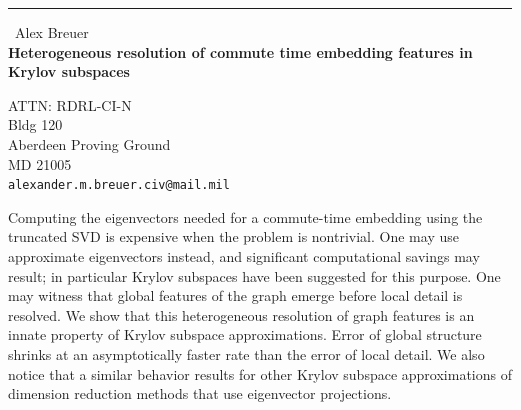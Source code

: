 \documentclass{report}
\begin{document}
\begin{center}
\rule{6in}{1pt} \
{\large Alex Breuer \\
{\bf Heterogeneous resolution of commute time embedding features in Krylov subspaces}}

ATTN: RDRL-CI-N \\ Bldg 120 \\ Aberdeen Proving Ground \\ MD 21005
\\
{\tt alexander.m.breuer.civ@mail.mil}\end{center}

Computing the eigenvectors needed for a commute-time embedding using the
truncated SVD is expensive when the problem is nontrivial. One may use
approximate eigenvectors instead, and significant computational savings
may result; in particular Krylov subspaces have been suggested for this
purpose. One may witness that global features of the graph emerge before
local detail is resolved. We show that this heterogeneous resolution of
graph features is an innate property of Krylov subspace approximations.
Error of global structure shrinks at an asymptotically faster rate than
the error of local detail. We also notice that a similar behavior results
for other Krylov subspace approximations of dimension reduction methods
that use eigenvector projections.
\end{document}

